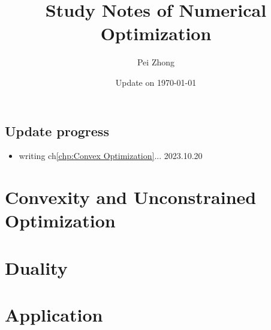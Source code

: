 \documentclass[12pt,oneside]{book} %
\begin{document}
\title{\bf \huge Study Notes of Numerical Optimization}
\author{Pei Zhong}
\date{Update on \today}

\maketitle


\tableofcontents

\begin{spacing}{1}

\chapter*{Update progress}
\begin{itemize}
    \item {writing ch\ref{chp:Convex Optimization}... \hfill 2023.10.20}
\end{itemize}






% 


\part{Convexity and Unconstrained Optimization}














\part{Duality}

\part{Application}




\end{spacing}
\end{document}
